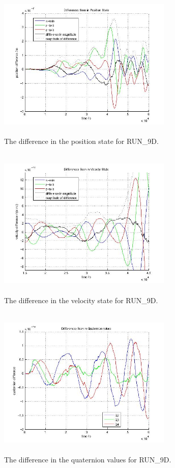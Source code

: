 \begin{description}
\begin{figure}[htp]
\begin{center}
\includegraphics[width=3.2736in,height=2.85in]{figures/run_9dpos.jpg}
\caption{The difference in the position state for RUN\_9D.}
\label{fig:sim79dpos}
\end{center}
\end{figure}

\begin{figure}[htp]
\begin{center}
\includegraphics[width=3.2736in,height=2.85in]{figures/run_9dvel.jpg}
\caption{The difference in the velocity state for RUN\_9D.}
\label{fig:sim79dvel}
\end{center}
\end{figure}

\begin{figure}[htp]
\begin{center}
\includegraphics[width=3.2736in,height=2.85in]{figures/run_9dquat.jpg}
\caption{The difference in the quaternion values for RUN\_9D.}
\label{fig:sim79dquat}
\end{center}
\end{figure}


\end{description}
